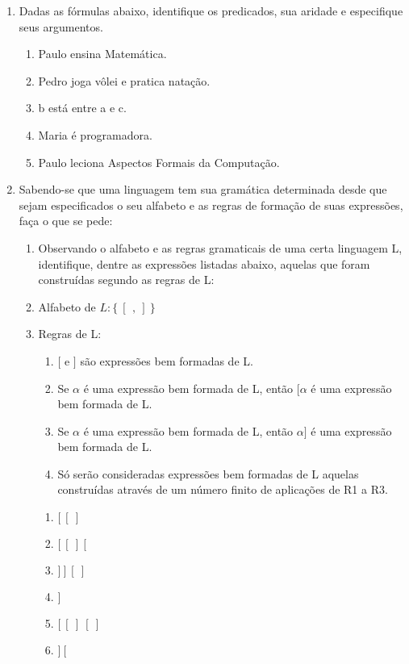 \begin{enumerate}[label=\arabic*)]
    \item Dadas as fórmulas abaixo, identifique os predicados, sua aridade e especifique seus argumentos.
    \begin{enumerate}[label=\alph*)]
        \item Paulo ensina Matemática.
        \item Pedro joga vôlei e pratica natação.
        \item b está entre a e c.
        \item Maria é programadora.
        \item Paulo leciona Aspectos Formais da Computação.
    \end{enumerate}

    \item Sabendo-se que uma linguagem tem sua gramática determinada desde que sejam especificados o seu alfabeto e as regras de formação de suas expressões, faça o que se pede:
    \begin{enumerate}[label=\alph*)]
        \item Observando o alfabeto e as regras gramaticais de uma certa linguagem L, identifique, dentre as expressões listadas abaixo, aquelas que foram construídas segundo as regras de L:

        \item[] Alfabeto de $L \colon \{\ [\ \, ,\ ]\ \}$
        \item[] Regras de L:
        \begin{enumerate}[label=R{\arabic*.}]
            \item $[$ e $]$ são expressões bem formadas de L.
            \item Se $\alpha$ é uma expressão bem formada de L, então $[ \alpha$ é uma expressão bem formada de L.
            \item Se $\alpha$ é uma expressão bem formada de L, então $\alpha ]$ é uma expressão bem formada de L.
            \item Só serão consideradas expressões bem formadas de L aquelas construídas através de um número finito de aplicações de R1 a R3.
        \end{enumerate}

        \begin{multicols}{2}
            \begin{enumerate}[label=(\alph*)]
                \item $[\ [\ ]$
                \item $[\ [\ ]\ [$
                \item $]\ ]\ [\ ]$
                \item $]$
                \item $[\ [\ ]\ [\ ]$
                \item $]\ [$
            \end{enumerate}
        \end{multicols}


\end{enumerate}
\end{enumerate}
